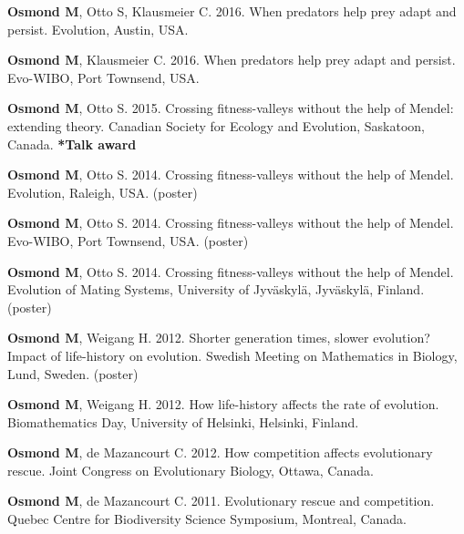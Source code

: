 \documentclass[12pt]{article}
\begin{document}
\textbf{Osmond M}, Otto S, Klausmeier C. 2016. When predators help prey adapt and persist. Evolution, Austin, USA. 

\textbf{Osmond M}, Klausmeier C. 2016. When predators help prey adapt and persist. Evo-WIBO, Port Townsend, USA.

\textbf{Osmond M}, Otto S. 2015. Crossing fitness-valleys without the help of Mendel: extending theory. Canadian Society for Ecology and Evolution, Saskatoon, Canada. \textbf{*Talk award}


\textbf{Osmond M}, Otto S. 2014. Crossing fitness-valleys without the help of Mendel. Evolution, Raleigh, USA. (poster)

\textbf{Osmond M}, Otto S. 2014. Crossing fitness-valleys without the help of Mendel. Evo-WIBO, Port Townsend, USA. (poster)


\textbf{Osmond M}, Otto S. 2014. Crossing fitness-valleys without the help of Mendel. Evolution of Mating Systems, University of Jyv\"askyl\"a, Jyv\"askyl\"a, Finland. (poster)


\textbf{Osmond M}, Weigang H. 2012. Shorter generation times, slower evolution? Impact of life-history on evolution. Swedish Meeting on Mathematics in Biology, Lund, Sweden. (poster)

\textbf{Osmond M}, Weigang H. 2012. How life-history affects the rate of evolution. Biomathematics Day, University of Helsinki, Helsinki, Finland.

\textbf{Osmond M}, de Mazancourt C. 2012. How competition affects evolutionary rescue. Joint Congress on Evolutionary Biology, Ottawa, Canada.

\textbf{Osmond M}, de Mazancourt C. 2011. Evolutionary rescue and competition. Quebec Centre for Biodiversity Science Symposium, Montreal, Canada.
\end{document}
